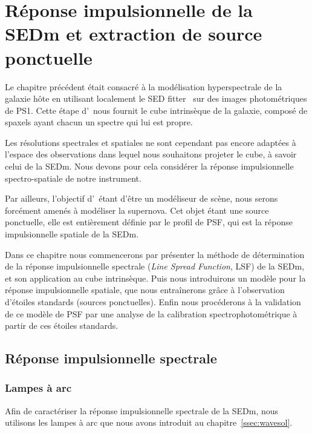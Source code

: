 \documentclass[../main/main.tex]{subfiles}
\begin{document}
\dominitoc
\faketableofcontents
\setcounter{chapter}{6}
\chapter{Réponse impulsionnelle de la SEDm et extraction de source ponctuelle}\label{ch:irf}
\minitoc
\vspace{1cm}
Le chapitre précédent était consacré à la modélisation hyperspectrale de
la galaxie hôte en utilisant localement le SED fitter \cigale\ sur des
images photométriques de PS1. Cette étape d'\hypergal\ nous fournit le
cube intrinsèque de la galaxie, composé de spaxels ayant chacun un
spectre qui lui est propre.

Les résolutions spectrales et spatiales ne sont cependant pas encore
adaptées à l'espace des observations dans lequel nous souhaitons projeter
le cube, à savoir celui de la SEDm. Nous devons pour cela considérer la
réponse impulsionnelle spectro-spatiale de notre instrument.

Par ailleurs, l'objectif d'\hypergal\ étant d'être un modéliseur de
scène, nous serons forcément amenés à modéliser la supernova. Cet objet
étant une source ponctuelle, elle est entièrement définie par le profil
de PSF, qui est la réponse impulsionnelle spatiale de la SEDm.

Dans ce chapitre nous commencerons par présenter la méthode de
détermination de la réponse impulsionnelle spectrale (\textit{Line
  Spread Function}, LSF) de la SEDm,
et son application au cube intrinsèque. Puis nous introduirons un modèle
pour la réponse impulsionnelle spatiale, que nous
entraînerons grâce à l'observation d'étoiles standards (sources
ponctuelles). Enfin nous procéderons à la validation de ce modèle de PSF par
une analyse de la calibration spectrophotométrique à partir de ces
étoiles standards.
\newpage

\section{Réponse impulsionnelle spectrale}

\subsection{Lampes à arc}

Afin de caractériser la réponse impulsionnelle spectrale de la SEDm, nous
utilisons les lampes à arc que nous avons introduit au
chapitre~\ref{ssec:wavesol}.
\end{document}
